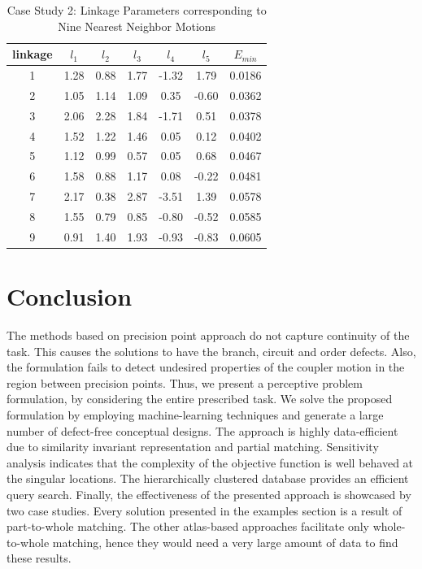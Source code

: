 \begin{table}
\caption{Case Study 2: Linkage Parameters corresponding to Nine Nearest Neighbor Motions}
\centering
\label{ex2_knnLinkageData}
\begin{tabular}{ccccccc}
\hline
  linkage & $l_1$ & $l_2$ & $l_3$ & $l_4$ & $l_5$ & $E_{min}$ \\
\hline
 1 & 1.28 & 0.88 & 1.77 & -1.32 & 1.79 & 0.0186   \\
 2 & 1.05 & 1.14 & 1.09 & 0.35 & -0.60 & 0.0362   \\
 3 & 2.06 & 2.28 & 1.84 & -1.71 & 0.51 & 0.0378   \\
 4 & 1.52 & 1.22 & 1.46 & 0.05 & 0.12 & 0.0402    \\
 5 & 1.12 & 0.99 & 0.57 & 0.05 & 0.68 & 0.0467    \\
 6 & 1.58 & 0.88 & 1.17 & 0.08 & -0.22 & 0.0481   \\
 7 & 2.17 & 0.38 & 2.87 & -3.51 & 1.39 & 0.0578   \\
 8 & 1.55 & 0.79 & 0.85 & -0.80 & -0.52 & 0.0585  \\
 9 & 0.91 & 1.40 & 1.93 & -0.93 & -0.83 & 0.0605
\end{tabular}
\end{table}




\section{Conclusion}
The methods based on precision point approach do not capture continuity of the task.
This causes the solutions to have the branch, circuit and order defects.
Also, the formulation fails to detect undesired properties of the coupler motion in the region between precision points.
Thus, we present a perceptive problem formulation, by considering the entire prescribed task.
We solve the proposed formulation by employing machine-learning techniques and generate a large number of defect-free conceptual designs.
The approach is highly data-efficient due to similarity invariant representation and partial matching.
Sensitivity analysis indicates that the complexity of the objective function is well behaved at the singular locations.
The hierarchically clustered database provides an efficient query search.
Finally, the effectiveness of the presented approach is showcased by two case studies.
Every solution presented in the examples section is a result of part-to-whole matching.
The other atlas-based approaches facilitate only whole-to-whole matching, hence they would need a very large amount of data to find these results.

